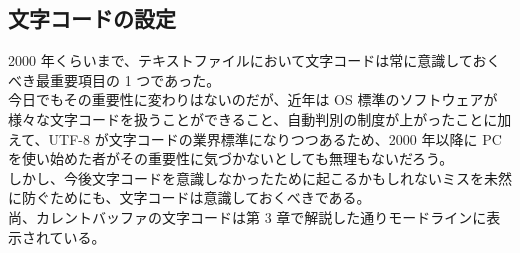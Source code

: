 \subsection{文字コードの設定}
2000 年くらいまで、テキストファイルにおいて文字コードは常に意識しておくべき最重要項目の 1 つであった。\\

今日でもその重要性に変わりはないのだが、近年は OS 標準のソフトウェアが様々な文字コードを扱うことができること、自動判別の制度が上がったことに加えて、UTF-8 が文字コードの業界標準になりつつあるため、2000 年以降に PC を使い始めた者がその重要性に気づかないとしても無理もないだろう。\\

しかし、今後文字コードを意識しなかったために起こるかもしれないミスを未然に防ぐためにも、文字コードは意識しておくべきである。\\

尚、カレントバッファの文字コードは第 3 章で解説した通りモードラインに表示されている。
